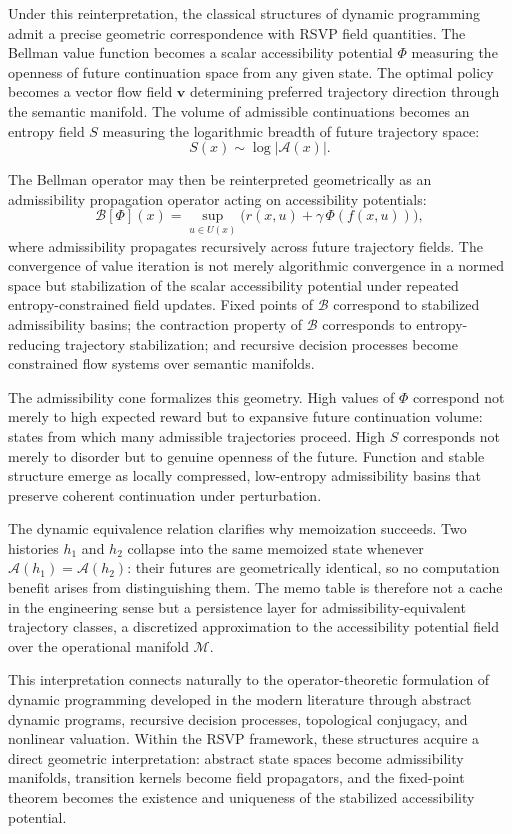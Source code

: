 \documentclass[12pt, a4paper, openany]{book}
\theoremstyle{plain}
\theoremstyle{definition}
\theoremstyle{remark}
\newcommand{\vvec}{\mathbf{v}}
\newcommand{\Sfield}{S}
\newcommand{\Adm}{\mathcal{A}}
\newcommand{\BellmanOp}{\mathcal{B}}
\begin{document}
Under this reinterpretation, the classical structures of dynamic programming admit a precise geometric correspondence with RSVP field quantities. The Bellman value function becomes a scalar accessibility potential $\Phi$ measuring the openness of future continuation space from any given state. The optimal policy becomes a vector flow field $\vvec$ determining preferred trajectory direction through the semantic manifold. The volume of admissible continuations becomes an entropy field $\Sfield$ measuring the logarithmic breadth of future trajectory space:
\[
\Sfield(x) \sim \log |\Adm(x)|.
\]

The Bellman operator may then be reinterpreted geometrically as an admissibility propagation operator acting on accessibility potentials:
\[
\BellmanOp[\Phi](x) = \sup_{u \in U(x)} \bigl(r(x,u) + \gamma\, \Phi(f(x,u))\bigr),
\]
where admissibility propagates recursively across future trajectory fields. The convergence of value iteration is not merely algorithmic convergence in a normed space but stabilization of the scalar accessibility potential under repeated entropy-constrained field updates. Fixed points of $\BellmanOp$ correspond to stabilized admissibility basins; the contraction property of $\BellmanOp$ corresponds to entropy-reducing trajectory stabilization; and recursive decision processes become constrained flow systems over semantic manifolds.

The admissibility cone formalizes this geometry. High values of $\Phi$ correspond not merely to high expected reward but to expansive future continuation volume: states from which many admissible trajectories proceed. High $\Sfield$ corresponds not merely to disorder but to genuine openness of the future. Function and stable structure emerge as locally compressed, low-entropy admissibility basins that preserve coherent continuation under perturbation.

The dynamic equivalence relation clarifies why memoization succeeds. Two histories $h_1$ and $h_2$ collapse into the same memoized state whenever $\Adm(h_1) = \Adm(h_2)$: their futures are geometrically identical, so no computation benefit arises from distinguishing them. The memo table is therefore not a cache in the engineering sense but a persistence layer for admissibility-equivalent trajectory classes, a discretized approximation to the accessibility potential field over the operational manifold $\mathcal{M}$.

This interpretation connects naturally to the operator-theoretic formulation of dynamic programming developed in the modern literature through abstract dynamic programs, recursive decision processes, topological conjugacy, and nonlinear valuation. Within the RSVP framework, these structures acquire a direct geometric interpretation: abstract state spaces become admissibility manifolds, transition kernels become field propagators, and the fixed-point theorem becomes the existence and uniqueness of the stabilized accessibility potential.
\end{document}
